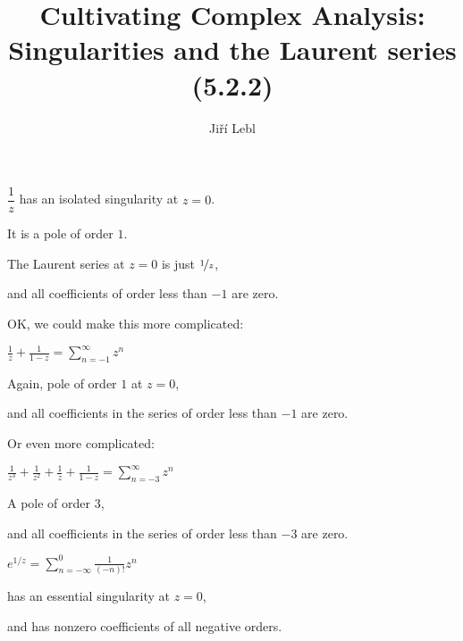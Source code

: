 \documentclass[10pt,aspectratio=169]{beamer}
\author{Ji\v{r}\'i Lebl}
\institute[OSU]{%
Departemento pri Matematiko de Oklahoma {\^S}tata Universitato}
\title{Cultivating Complex Analysis:\\%
Singularities and the Laurent series (5.2.2)}
\date{}
\begin{document}
\begin{frame}
\titlepage
\end{frame}

\begin{frame}
$\dfrac{1}{z}$ has an isolated singularity at $z=0$.

\medskip
\pause

It is a pole of order $1$.

\medskip
\pause

The Laurent series at $z=0$ is just $\nicefrac{1}{z}$,

and all
coefficients of order less than $-1$ are zero.

\end{frame}

\begin{frame}
OK, we could make this more complicated:

\medskip

$\displaystyle
\frac{1}{z} + \frac{1}{1-z}
=
\sum_{n=-1}^\infty z^n
$

\medskip
\pause

Again, pole of order $1$ at $z=0$,

and all coefficients in the series
of order less than $-1$ are zero.

\end{frame}

\begin{frame}
Or even more complicated:

\medskip

$\displaystyle
\frac{1}{z^3} + \frac{1}{z^2} + \frac{1}{z} + \frac{1}{1-z}
=
\sum_{n=-3}^\infty z^n
$

\medskip
\pause

A pole of order $3$,

and all coefficients in the series
of order less than $-3$ are zero.
\end{frame}

\begin{frame}
$\displaystyle
e^{1/z}
=
\sum_{n=-\infty}^0 \frac{1}{(-n)!} z^n
$

\medskip

has an essential singularity at $z=0$,

and has nonzero coefficients of all negative orders.
\end{frame}
\end{document}
